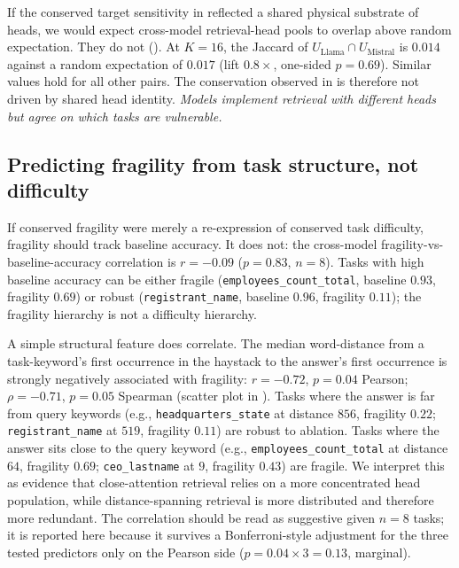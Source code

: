 \documentclass{article}
\theoremstyle{plain}
\theoremstyle{definition}
\theoremstyle{remark}
\begin{document}
If the conserved target sensitivity in  reflected a shared physical substrate of heads, we would expect cross-model retrieval-head pools to overlap above random expectation. They do not (). At $K{=}16$, the Jaccard of $U_{\text{Llama}} \cap U_{\text{Mistral}}$ is $0.014$ against a random expectation of $0.017$ (lift $0.8\times$, one-sided $p{=}0.69$). Similar values hold for all other pairs. The conservation observed in  is therefore not driven by shared head identity. \emph{Models implement retrieval with different heads but agree on which tasks are vulnerable.}

\subsection{Predicting fragility from task structure, not difficulty}
\label{sec:predictors}

If conserved fragility were merely a re-expression of conserved task difficulty, fragility should track baseline accuracy. It does not: the cross-model fragility-vs-baseline-accuracy correlation is $r = -0.09$ ($p = 0.83$, $n=8$). Tasks with high baseline accuracy can be either fragile (\texttt{employees\_count\_total}, baseline $0.93$, fragility $0.69$) or robust (\texttt{registrant\_name}, baseline $0.96$, fragility $0.11$); the fragility hierarchy is not a difficulty hierarchy.

A simple structural feature does correlate. The median word-distance from a task-keyword's first occurrence in the haystack to the answer's first occurrence is strongly negatively associated with fragility: $r = -0.72$, $p = 0.04$ Pearson; $\rho = -0.71$, $p = 0.05$ Spearman (scatter plot in ). Tasks where the answer is far from query keywords (e.g., \texttt{headquarters\_state} at distance $856$, fragility $0.22$; \texttt{registrant\_name} at $519$, fragility $0.11$) are robust to ablation. Tasks where the answer sits close to the query keyword (e.g., \texttt{employees\_count\_total} at distance $64$, fragility $0.69$; \texttt{ceo\_lastname} at $9$, fragility $0.43$) are fragile. We interpret this as evidence that close-attention retrieval relies on a more concentrated head population, while distance-spanning retrieval is more distributed and therefore more redundant. The correlation should be read as suggestive given $n{=}8$ tasks; it is reported here because it survives a Bonferroni-style adjustment for the three tested predictors only on the Pearson side ($p = 0.04 \times 3 = 0.13$, marginal).
\end{document}
